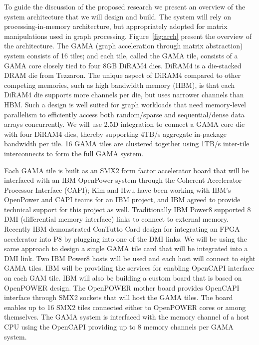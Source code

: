 \noindent 
To guide the discussion of the proposed research we present an overview of the system architecture that we will design and build. 
The system will rely on processing-in-memory architecture, but appropriately adopted for matrix manipulations used in graph processing.   
Figure~\ref{fig:arch} present the overview of the architecture. 
The GAMA (graph acceleration through matrix abstraction) system consists of 16 tiles; and each tile, called the GAMA tile, consists of a GAMA core closely tied to four 8GB DiRAM4 dies. 
DiRAM4 is a die-stacked DRAM die from Tezzaron.
The unique aspect of DiRAM4 compared to other competing memories, such as high bandwidth memory (HBM), is that each DiRAM4 die supports more channels per die, but uses narrower channels than HBM. 
Such a design is well suited for graph workloads that need memory-level parallelism to efficiently access both random/sparse and sequential/dense data arrays concurrently. 
We will use 2.5D integration to connect a GAMA core die with four DiRAM4 dies, thereby supporting 4TB/s aggregate in-package bandwidth per tile.  
16 GAMA tiles are clustered together using 1TB/s inter-tile interconnects to form the full GAMA system. 

Each GAMA tile is built as an SMX2 form factor accelerator board that will be interfaced with an IBM OpenPower system through the Coherent Accelerator Processor Interface (CAPI);
Kim and Hwu have been working with IBM's OpenPower and CAPI teams for an IBM project, and IBM agreed to provide technical support for this project as well. %
Traditionally IBM Power8 supported 8 DMI (differential memory interface) links  to connect to external memory. 
Recently IBM demonstrated ConTutto Card design for integrating an FPGA accelerator into P8 by plugging into one of the DMI links. 
We will be using the same approach to design a single GAMA tile card that will be integrated into a DMI link. 
Two IBM Power8 hosts will be used and each host will connect to eight GAMA tiles.  
IBM will be providing the services for enabling OpenCAPI interface on each GAM tile. 
IBM will also be building a custom board that is based on OpenPOWER design. 
The OpenPOWER mother board provides OpenCAPI interface through SMX2 sockets that will host the GAMA tiles. 
The board enables up to 16 SMX2 tiles connected either to OpenPOWER cores or among themselves. 
The GAMA  system is interfaced with the memory channel of a host CPU using the OpenCAPI providing up to 8 memory channels per GAMA system.

